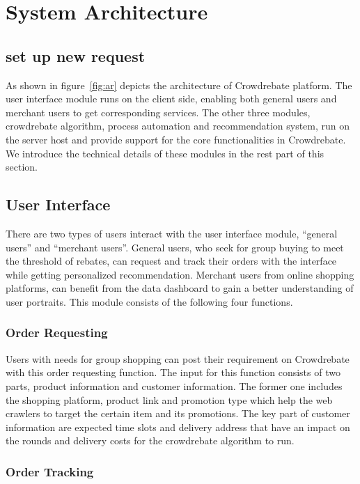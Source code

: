 \section{System Architecture}

\subsection{set up new request}

As shown in figure~\ref{fig:ar} depicts the architecture of Crowdrebate platform. The user interface module runs on the client side, enabling both general users and merchant users to get corresponding services. The other three modules, crowdrebate algorithm, process automation and recommendation system, run on the server host and provide support for the core functionalities in Crowdrebate. We introduce the technical details of these modules in the rest part of this section.

\subsection{User Interface}

There are two types of users interact with the user interface module, ``general users'' and ``merchant users''. General users, who seek for group buying to meet the threshold of rebates, can request and track their orders with the interface while getting personalized recommendation. Merchant users from online shopping platforms, can benefit from the data dashboard to gain a better understanding of user portraits. This module consists of the following four functions.

\subsubsection{Order Requesting}

Users with needs for group shopping can post their requirement on Crowdrebate with this order requesting function. The input for this function consists of two parts, product information and customer information. The former one includes the shopping platform, product link and promotion type which help the web crawlers to target the certain item and its promotions. The key part of customer information are expected time slots and delivery address that have an impact on the rounds and delivery costs for the crowdrebate algorithm to run.

\subsubsection{Order Tracking}

